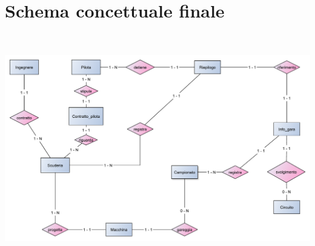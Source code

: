 \documentclass[a4paper,12pt]{report}
\begin{document}
		\section{Schema concettuale finale}
		\bigskip\bigskip\bigskip 
		\begin{center}
				\hspace*{-3cm}%
				\includegraphics[width=\dimexpr\textwidth+6cm\relax, height=10cm]{copies/scheletrone.pdf}%
				\hspace*{-3cm}%
			\end{center}
		\pagebreak
\end{document}
